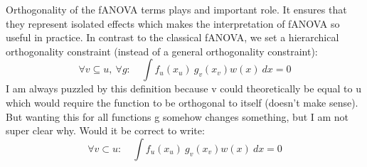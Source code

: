 Orthogonality of the fANOVA terms plays and important role. It ensures that they represent isolated effects which makes the interpretation of fANOVA so useful in practice.
In contrast to the classical fANOVA, we set a hierarchical orthogonality constraint (instead of a general orthogonality constraint):
\begin{equation}
\forall v \subseteq u,\ \forall g:\quad 
\int f_u(x_u)\ g_v(x_v) w(x)\ dx = 0
\label{eq:orthogonality_generalized}
\end{equation}
{\color{blue} I am always puzzled by this definition because v could theoretically be equal to u which would require the function to be orthogonal to itself (doesn't make sense). But wanting this for all functions g somehow changes something, but I am not super clear why. Would it be correct to write:}
\begin{equation}
\forall v \subset u :\quad 
\int f_u(x_u)\ g_v(x_v) w(x)\ dx = 0
\label{eq:orthogonality_generalized}
\end{equation}

